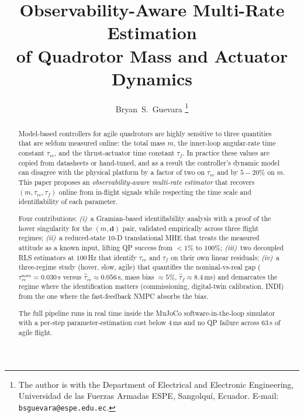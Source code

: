 \documentclass[lettersize,journal]{IEEEtran}
\newcommand{\vect}[1]{\bm{#1}}
\begin{document}
\title{Observability-Aware Multi-Rate Estimation\\
of Quadrotor Mass and Actuator Dynamics}

\author{Bryan~S.~Guevara%
\thanks{The author is with the Department of Electrical and Electronic
Engineering, Universidad de las Fuerzas Armadas ESPE, Sangolqu\'i,
Ecuador. E-mail: \texttt{bsguevara@espe.edu.ec}.}}

\maketitle

\begin{abstract}
Model-based controllers for agile quadrotors are highly sensitive
to three quantities that are seldom measured online: the total
mass $m$, the inner-loop angular-rate time constant $\tau_{rc}$,
and the thrust-actuator time constant $\tau_f$.  In practice these
values are copied from datasheets or hand-tuned, and as a result
the controller's dynamic model can disagree with the physical
platform by a factor of two on $\tau_{rc}$ and by $5\!-\!20\%$ on
$m$.  This paper proposes an \emph{observability-aware multi-rate
estimator} that recovers $(m,\tau_{rc},\tau_f)$ online from
in-flight signals while respecting the time scale and
identifiability of each parameter.

Four contributions:
\emph{(i)}~a Gramian-based identifiability analysis with a proof
of the hover singularity for the $(m,\vect d)$ pair, validated
empirically across three flight regimes;
\emph{(ii)}~a reduced-state $10$-D translational MHE that treats
the measured attitude as a known input, lifting QP success from
$<\!1\%$ to $100\%$;
\emph{(iii)}~two decoupled RLS estimators at $100$\,Hz that
identify $\tau_{rc}$ and $\tau_f$ on their own linear residuals;
\emph{(iv)}~a three-regime study (hover, slow, agile) that
quantifies the nominal-vs-real gap ($\tau_{rc}^{nom}\!=\!0.030$\,s
versus $\hat\tau_{rc}\!\approx\!0.056$\,s, mass bias
$\approx\!5\%$, $\hat\tau_f\!\approx\!8.4$\,ms) and demarcates
the regime where the identification matters (commissioning,
digital-twin calibration, INDI) from the one where the
fast-feedback NMPC absorbs the bias.

The full pipeline runs in real time inside the MuJoCo
software-in-the-loop simulator with a per-step parameter-estimation
cost below $4$\,ms and no QP failure across $63$\,s of agile flight.
\end{abstract}
\end{document}
